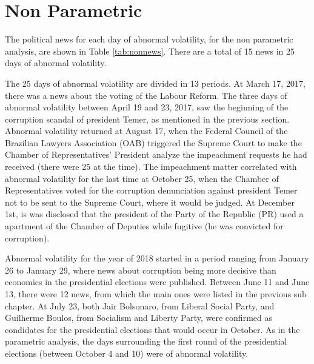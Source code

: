 \documentclass[cic,tc, english]{iiufrgs}
\begin{document}
\section{Non Parametric}

    The political news for each day of abnormal volatility, for the non parametric analysis, are shown in Table \ref{tab:nonnews}. There are a total of 15 news in 25 days of abnormal volatility.

    

    The 25 days of abnormal volatility are divided in 13 periods. At March 17, 2017, there was a news about the voting of the Labour Reform. The three days of abnormal volatility between April 19 and 23, 2017, saw the beginning of the corruption scandal of president Temer, as mentioned in the previous section. Abnormal volatility returned at August 17, when the Federal Council of the Brazilian Lawyers Association (OAB) triggered the Supreme Court to make the Chamber of Representatives' President analyze the impeachment requests he had received (there were 25 at the time). The impeachment matter correlated with abnormal volatility for the last time at October 25, when the Chamber of Representatives voted for the corruption denunciation against president Temer not to be sent to the Supreme Court, where it would be judged. At December 1st, is was disclosed that the president of the Party of the Republic (PR) used a apartment of the Chamber of Deputies while fugitive (he was convicted for corruption).

    Abnormal volatility for the year of 2018 started in a period ranging from January 26 to January 29, where news about corruption being more decisive than economics in the presidential elections were published. Between June 11 and June 13, there were 12 news, from which the main ones were listed in the previous sub chapter. At July 23, both Jair Bolsonaro, from Liberal Social Party, and Guilherme Boulos, from Socialism and Liberty Party, were confirmed as condidates for the presidential elections that would occur in October. As in the parametric analysis, the days surrounding the first round of the presidential elections (between October 4 and 10) were of abnormal volatility.
\end{document}

